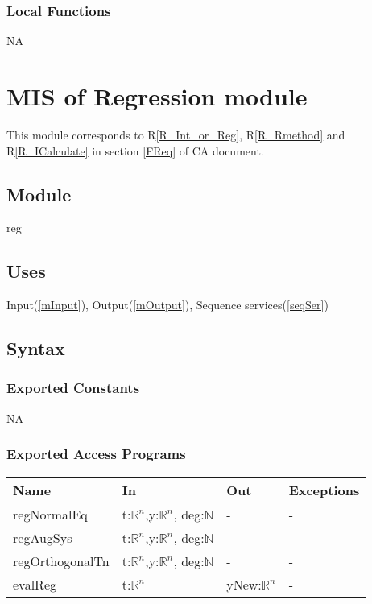 \documentclass[12pt, titlepage]{article}
\begin{document}
\subsubsection{Local Functions}

NA


\section{MIS of Regression module} \label{mReg}

This module corresponds to R\ref{R_Int_or_Reg}, R\ref{R_Rmethod} and 
R\ref{R_ICalculate} in section \ref{FReq} of CA document.

\subsection{Module}

reg

\subsection{Uses}

Input(\ref{mInput}), Output(\ref{mOutput}), Sequence services(\ref{seqSer})

\subsection{Syntax}

\subsubsection{Exported Constants}

NA

\subsubsection{Exported Access Programs}

\begin{center}
	\begin{tabular}{p{4cm} p{4cm} p{4cm} p{1cm}}
		\hline
		\textbf{Name} & \textbf{In} & \textbf{Out} & \textbf{Exceptions} \\
		\hline
		regNormalEq & t:$\mathbb{R}^n$,y:$\mathbb{R}^n$, deg:$\mathbb{N}$  & 
		- & - \\
		regAugSys & t:$\mathbb{R}^n$,y:$\mathbb{R}^n$, deg:$\mathbb{N}$ & -
		& - \\
		regOrthogonalTn & t:$\mathbb{R}^n$,y:$\mathbb{R}^n$,  
		deg:$\mathbb{N}$ & -
		& - \\
		evalReg & t:$\mathbb{R}^n$ & yNew:$\mathbb{R}^n$ & - \\
		
		\hline
	\end{tabular}
\end{center}
\end{document}
